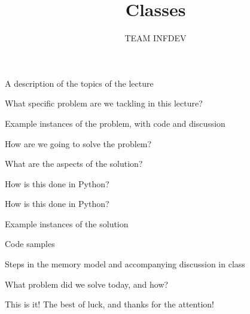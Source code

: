 \documentclass{beamer}
\title{Classes}
\author{TEAM INFDEV}
\institute{Hogeschool Rotterdam \\ 
Rotterdam, Netherlands}
\date{}
\begin{document}
\maketitle

\begin{slide}{
\item A description of the topics of the lecture
}\end{slide}

\begin{slide}{
\item What specific problem are we tackling in this lecture?
}\end{slide}

\begin{slide}{
\item Example instances of the problem, with code and discussion
}\end{slide}

\begin{slide}{
\item How are we going to solve the problem?
}\end{slide}

\begin{slide}{
\item What are the aspects of the solution?
}\end{slide}

\begin{slide}{
\item How is this done in Python?
}\end{slide}

\begin{slide}{
\item How is this done in Python?
}\end{slide}

\begin{slide}{
\item Example instances of the solution
\item Code samples
\item Steps in the memory model and accompanying discussion in class
}\end{slide}

\begin{slide}{
\item What problem did we solve today, and how?
}\end{slide}

\begin{frame}{This is it!}
\center
\fontsize{18pt}{7.2}\selectfont
The best of luck, and thanks for the attention!
\end{frame}
\end{document}
